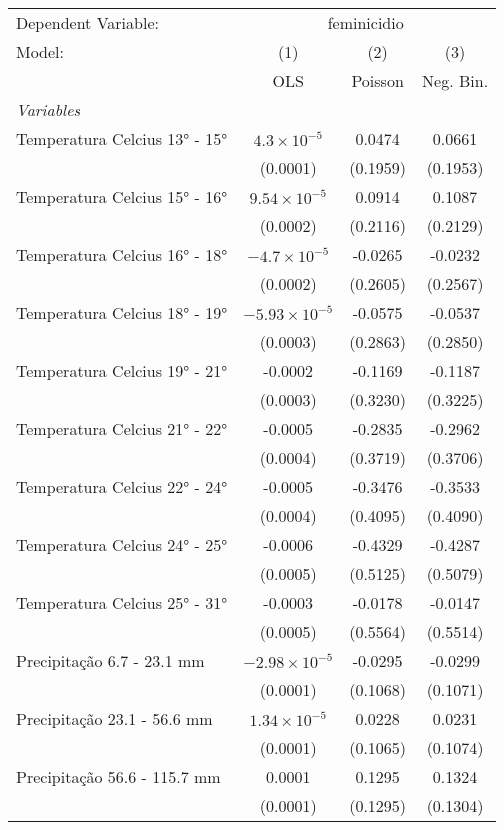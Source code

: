 \documentclass[
]{article}
\begin{document}
\begin{tabular}{lccc}
\tabularnewline\midrule\midrule
Dependent Variable:&\multicolumn{3}{c}{feminicidio}\\
Model:&(1) & (2) & (3)\\
 &  OLS & Poisson & Neg. Bin.\\
\midrule \emph{Variables}&   &   &  \\
Temperatura Celcius 13° - 15° & $4.3\times 10^{-5}$ & 0.0474 & 0.0661\\
  &(0.0001) & (0.1959) & (0.1953)\\
Temperatura Celcius 15° - 16° & $9.54\times 10^{-5}$ & 0.0914 & 0.1087\\
  &(0.0002) & (0.2116) & (0.2129)\\
Temperatura Celcius 16° - 18° & $-4.7\times 10^{-5}$ & -0.0265 & -0.0232\\
  &(0.0002) & (0.2605) & (0.2567)\\
Temperatura Celcius 18° - 19° & $-5.93\times 10^{-5}$ & -0.0575 & -0.0537\\
  &(0.0003) & (0.2863) & (0.2850)\\
Temperatura Celcius 19° - 21° & -0.0002 & -0.1169 & -0.1187\\
  &(0.0003) & (0.3230) & (0.3225)\\
Temperatura Celcius 21° - 22° & -0.0005 & -0.2835 & -0.2962\\
  &(0.0004) & (0.3719) & (0.3706)\\
Temperatura Celcius 22° - 24° & -0.0005 & -0.3476 & -0.3533\\
  &(0.0004) & (0.4095) & (0.4090)\\
Temperatura Celcius 24° - 25° & -0.0006 & -0.4329 & -0.4287\\
  &(0.0005) & (0.5125) & (0.5079)\\
Temperatura Celcius 25° - 31° & -0.0003 & -0.0178 & -0.0147\\
  &(0.0005) & (0.5564) & (0.5514)\\
Precipitação 6.7 - 23.1 mm & $-2.98\times 10^{-5}$ & -0.0295 & -0.0299\\
  &(0.0001) & (0.1068) & (0.1071)\\
Precipitação 23.1 - 56.6 mm & $1.34\times 10^{-5}$ & 0.0228 & 0.0231\\
  &(0.0001) & (0.1065) & (0.1074)\\
Precipitação 56.6 - 115.7 mm & 0.0001 & 0.1295 & 0.1324\\
  &(0.0001) & (0.1295) & (0.1304)\\

\end{tabular}
\end{document}
